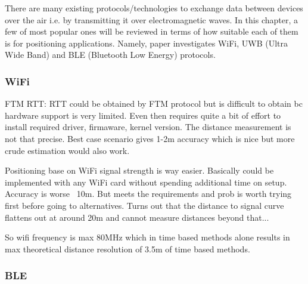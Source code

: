 There are many existing protocols/technologies to exchange data between devices over the air i.e. by transmitting it over electromagnetic waves. In this chapter, a few of most popular ones will be reviewed in terms of how suitable each of them is for positioning applications. Namely, paper investigates WiFi, UWB (Ultra Wide Band) and BLE (Bluetooth Low Energy) protocols.

\subsubsection{WiFi}

FTM RTT: RTT could be obtained by FTM protocol but is difficult to obtain bc hardware support is very limited. Even then requires quite a bit of effort to install required driver, firmaware, kernel version. The distance measurement is not that precise. Best case scenario gives 1-2m accuracy which is nice but more crude estimation would also work.

Positioning base on WiFi signal strength is way easier. Basically could be implemented with any WiFi card without spending additional time on setup. Accuracy is worse ~10m. But meets the requirements and prob is worth trying first before going to alternatives. Turns out that the distance to signal curve flattens out at around 20m and cannot measure distances beyond that...

So wifi frequency is max 80MHz which in time based methods alone results in max theoretical distance resolution of 3.5m of time based methods.




\subsubsection{BLE}

